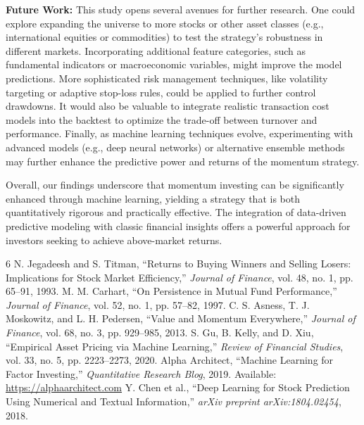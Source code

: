 \documentclass[conference]{IEEEtran}
\begin{document}
\textbf{Future Work:} This study opens several avenues for further research. One could explore expanding the universe to more stocks or other asset classes (e.g., international equities or commodities) to test the strategy's robustness in different markets. Incorporating additional feature categories, such as fundamental indicators or macroeconomic variables, might improve the model predictions. More sophisticated risk management techniques, like volatility targeting or adaptive stop-loss rules, could be applied to further control drawdowns. It would also be valuable to integrate realistic transaction cost models into the backtest to optimize the trade-off between turnover and performance. Finally, as machine learning techniques evolve, experimenting with advanced models (e.g., deep neural networks) or alternative ensemble methods may further enhance the predictive power and returns of the momentum strategy.

Overall, our findings underscore that momentum investing can be significantly enhanced through machine learning, yielding a strategy that is both quantitatively rigorous and practically effective. The integration of data-driven predictive modeling with classic financial insights offers a powerful approach for investors seeking to achieve above-market returns.

\begin{thebibliography}{6}
 N. Jegadeesh and S. Titman, ``Returns to Buying Winners and Selling Losers: Implications for Stock Market Efficiency,'' \emph{Journal of Finance}, vol. 48, no. 1, pp. 65--91, 1993.
 M. M. Carhart, ``On Persistence in Mutual Fund Performance,'' \emph{Journal of Finance}, vol. 52, no. 1, pp. 57--82, 1997.
 C. S. Asness, T. J. Moskowitz, and L. H. Pedersen, ``Value and Momentum Everywhere,'' \emph{Journal of Finance}, vol. 68, no. 3, pp. 929--985, 2013.
 S. Gu, B. Kelly, and D. Xiu, ``Empirical Asset Pricing via Machine Learning,'' \emph{Review of Financial Studies}, vol. 33, no. 5, pp. 2223--2273, 2020.
 Alpha Architect, ``Machine Learning for Factor Investing,'' \emph{Quantitative Research Blog}, 2019. Available: \url{https://alphaarchitect.com}
 Y. Chen et al., ``Deep Learning for Stock Prediction Using Numerical and Textual Information,'' \emph{arXiv preprint arXiv:1804.02454}, 2018.
\end{thebibliography}
\end{document}

